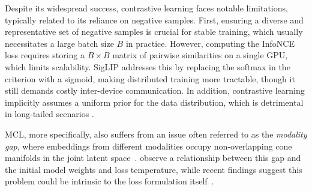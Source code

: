 \documentclass{article}
\newcommand{\alain}[1]{\textcolor{magenta}{#1}}
\begin{document}

Despite its widespread success, contrastive learning faces notable limitations, typically related to its reliance on negative samples.
First, ensuring a diverse and representative set of negative samples is crucial for stable training, which usually necessitates a large batch size $B$ in practice.
However, computing the InfoNCE loss requires storing a $B \times B$ matrix of pairwise similarities on a single GPU, which limits scalability.
SigLIP \cite{SigLIP} addresses this by replacing the softmax in the criterion with a sigmoid, making distributed training more tractable, though it still demands costly inter-device communication.
In addition, contrastive learning implicitly assumes a uniform prior for the data distribution, which is detrimental in long-tailed scenarios \cite{Assran2023}.

MCL, more specifically, also suffers from an issue often referred to as the \textit{modality gap}, where embeddings from different modalities occupy non-overlapping cone manifolds in the joint latent space~\cite{liang2022mind}.
\cite{Shi2023} observe a relationship between this gap and the initial model weights and loss temperature, while recent findings suggest this problem could be intrinsic to the loss formulation itself~\cite{Fahim2024}.

\end{document}
